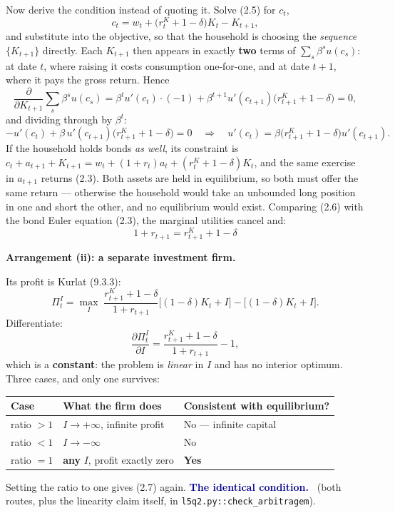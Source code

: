 \documentclass[11pt, a4paper]{article}
\newcommand{\passo}[1]{\medskip\noindent\textbf{#1}\par\nobreak}
\newcommand{\resp}[1]{%
  \ifmmode {\color{darkblue}#1}\else\textcolor{darkblue}{\textbf{#1}}\fi}
\begin{document}
\smallskip
Now derive the condition instead of quoting it. Solve (2.5) for $c_t$,
\[
c_t=w_t+\big(r^K_t+1-\delta\big)K_t-K_{t+1},
\]
and substitute into the objective, so that the household is choosing the \emph{sequence}
$\{K_{t+1}\}$ directly. Each $K_{t+1}$ then appears in exactly \textbf{two} terms of
$\sum_s\beta^s u(c_s)$: at date $t$, where raising it costs consumption one-for-one, and at
date $t+1$, where it pays the gross return. Hence
\[
\frac{\partial}{\partial K_{t+1}}\sum_{s}\beta^s u(c_s)
=\beta^t u'(c_t)\cdot(-1)+\beta^{t+1}u'(c_{t+1})\big(r^K_{t+1}+1-\delta\big)=0 ,
\]
and dividing through by $\beta^t$:
\[
-u'(c_t)+\beta\,u'(c_{t+1})\big(r^K_{t+1}+1-\delta\big)=0
\quad\Longrightarrow\quad
u'(c_t)=\beta\big(r^K_{t+1}+1-\delta\big)u'(c_{t+1}).
\tag{2.6}
\]
If the household holds bonds \emph{as well}, its constraint is
$c_t+a_{t+1}+K_{t+1}=w_t+(1+r_t)a_t+(r^K_t+1-\delta)K_t$, and the same exercise in
$a_{t+1}$ returns (2.3). Both assets are held in equilibrium, so both must offer the same
return --- otherwise the household would take an unbounded long position in one and short
the other, and no equilibrium would exist. Comparing (2.6) with the bond Euler equation
(2.3), the marginal utilities cancel and:
\[
\boxed{\;1+r_{t+1}=r^K_{t+1}+1-\delta\;}
\tag{2.7}
\]

\passo{Arrangement (ii): a separate investment firm.} Its profit is Kurlat (9.3.3):
\[
\Pi^I_t=\max_{I}\;\frac{r^K_{t+1}+1-\delta}{1+r_{t+1}}\big[(1-\delta)K_t+I\big]
-\big[(1-\delta)K_t+I\big].
\]
Differentiate:
\[
\frac{\partial \Pi^I_t}{\partial I}=\frac{r^K_{t+1}+1-\delta}{1+r_{t+1}}-1 ,
\]
which is a \textbf{constant}: the problem is \emph{linear} in $I$ and has no interior
optimum. Three cases, and only one survives:

\begin{center}
\small
\begin{tabular}{@{}lll@{}}
\toprule
Case & What the firm does & Consistent with equilibrium? \\
\midrule
ratio $>1$ & $I\to+\infty$, infinite profit & No --- infinite capital \\
ratio $<1$ & $I\to-\infty$ & No \\
ratio $=1$ & \textbf{any} $I$, profit exactly zero & \textbf{Yes} \\
\bottomrule
\end{tabular}
\end{center}

Setting the ratio to one gives (2.7) again. \resp{The identical condition.} \checkmark\
(both routes, plus the linearity claim itself, in \texttt{l5q2.py::check\_arbitragem}).
\end{document}
